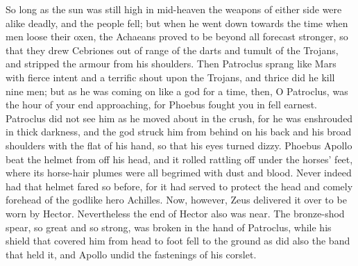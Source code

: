 So long as the sun was still high in mid-heaven the weapons of either side
were alike deadly, and the people fell; but when he went down towards the
time when men loose their oxen, the Achaeans proved to be beyond all
forecast stronger, so that they drew Cebriones out of range of the darts
and tumult of the Trojans, and stripped the armour from his shoulders.
Then Patroclus sprang like Mars with fierce intent and a terrific shout
upon the Trojans, and thrice did he kill nine men; but as he was coming on
like a god for a time, then, O Patroclus, was the hour of your end
approaching, for Phoebus fought you in fell earnest. Patroclus did not see
him as he moved about in the crush, for he was enshrouded in thick
darkness, and the god struck him from behind on his back and his broad
shoulders with the flat of his hand, so that his eyes turned dizzy.
Phoebus Apollo beat the helmet from off his head, and it rolled rattling
off under the horses’ feet, where its horse-hair plumes were all begrimed
with dust and blood. Never indeed had that helmet fared so before, for it
had served to protect the head and comely forehead of the godlike hero
Achilles. Now, however, Zeus delivered it over to be worn by Hector.
Nevertheless the end of Hector also was near. The bronze-shod spear, so
great and so strong, was broken in the hand of Patroclus, while his shield
that covered him from head to foot fell to the ground as did also the band
that held it, and Apollo undid the fastenings of his corslet.

